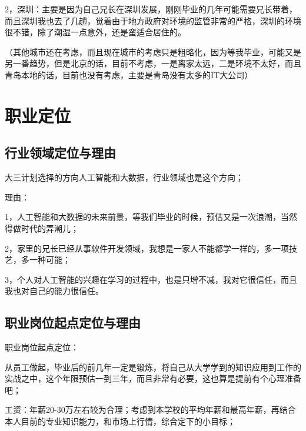 \documentclass{article}
\begin{document}
2，深圳：主要是因为自己兄长在深圳发展，刚刚毕业的几年可能需要兄长带着，而且深圳我也去了几趟，觉着由于地方政府对环境的监管非常的严格，深圳的环境很不错，除了潮湿一点意外，还是蛮适合居住的。\par
（其他城市还在考虑，而且现在城市的考虑只是粗略化，因为等我毕业，可能又是另一番趋势，但是北京的话，目前不考虑，一是离家太远，二是环境不太好，而且青岛本地的话，目前也没有考虑，主要是青岛没有太多的IT大公司）

\section{职业定位}

\subsection{行业领域定位与理由}
大三计划选择的方向人工智能和大数据，行业领域也是这个方向；\par
理由：\par
1，人工智能和大数据的未来前景，等我们毕业的时候，预估又是一次浪潮，当然得做时代的弄潮儿；\par
2，家里的兄长已经从事软件开发领域，我想是一家人不能都学一样的，多一项技艺，多一种可能；\par
3，个人对人工智能的兴趣在学习的过程中，也是只增不减，我对它很信任，而且我也对自己的能力很信任。\par

\subsection{职业岗位起点定位与理由}
职业岗位起点定位：\par
从员工做起，毕业后的前几年一定是锻炼，将自己从大学学到的知识应用到工作的实战之中，这个年限预估一到三年，而且非常有必要，这也算是提前有个心理准备吧；\par
工资：年薪20-30万左右较为合理；考虑到本学校的平均年薪和最高年薪，再结合本人目前的专业知识能力，和市场上行情，综合定下的小目标；\par
\end{document}
